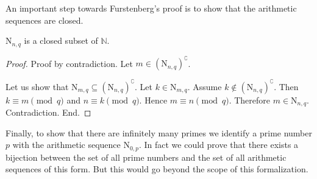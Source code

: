 \documentclass{article}
\newcommand{\N}[2]{\mathrm{N}_{#1,#2}}
\begin{document}
  An important step towards Furstenberg's proof is to show that the arithmetic
  sequences are closed.

  \begin{forthel}
    \begin{lemma}
      $\N{n}{q}$ is a closed subset of $\mathbb{N}$.
    \end{lemma}
    \begin{proof}
      Proof by contradiction.
      Let $m \in (\N{n}{q})^{\complement}$.

      Let us show that $\N{m}{q} \subseteq (\N{n}{q})^{\complement}$.
        Let $k \in \N{m}{q}$.
        Assume $k \notin (\N{n}{q})^{\complement}$.
        Then $k \equiv m \pmod{q}$ and $n \equiv k \pmod{q}$.
        Hence $m \equiv n \pmod{q}$.
        Therefore $m \in \N{n}{q}$.
        Contradiction.
      End.
    \end{proof}
  \end{forthel}

  Finally, to show that there are infinitely many primes we identify a prime
  number $p$ with the arithmetic sequence $\N{0}{p}$.
  In fact we could prove that there exists a bijection between the set of all
  prime numbers and the set of all arithmetic sequences of this form.
  But this would go beyond the scope of this formalization.
\end{document}
